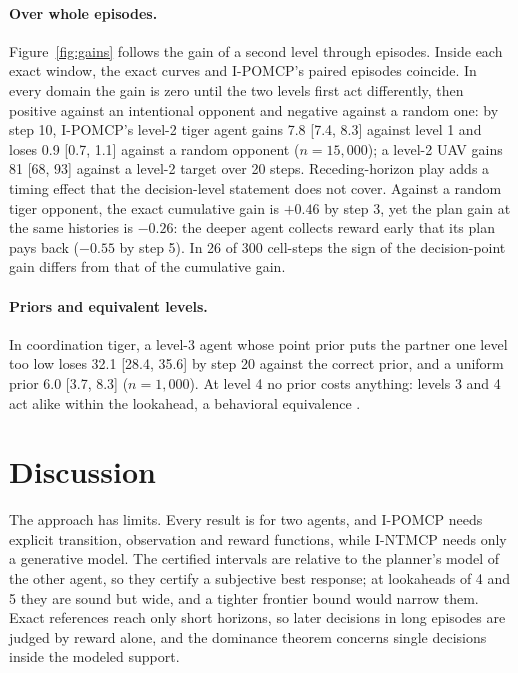 \documentclass{article}
\begin{document}
\paragraph{Over whole episodes.} Figure~\ref{fig:gains} follows the gain of a second level through episodes. Inside each exact window, the exact curves and I-POMCP's paired episodes coincide. In every domain the gain is zero until the two levels first act differently, then positive against an intentional opponent and negative against a random one: by step 10, I-POMCP's level-2 tiger agent gains 7.8 [7.4, 8.3] against level 1 and loses 0.9 [0.7, 1.1] against a random opponent ($n = 15{,}000$); a level-2 UAV gains 81 [68, 93] against a level-2 target over 20 steps. Receding-horizon play adds a timing effect that the decision-level statement does not cover. Against a random tiger opponent, the exact cumulative gain is $+0.46$ by step 3, yet the plan gain at the same histories is $-0.26$: the deeper agent collects reward early that its plan pays back ($-0.55$ by step 5). In 26 of 300 cell-steps the sign of the decision-point gain differs from that of the cumulative gain.

\paragraph{Priors and equivalent levels.} In coordination tiger, a level-3 agent whose point prior puts the partner one level too low loses 32.1 [28.4, 35.6] by step 20 against the correct prior, and a uniform prior 6.0 [3.7, 8.3] ($n = 1{,}000$). At level 4 no prior costs anything: levels 3 and 4 act alike within the lookahead, a behavioral equivalence \cite{rathnasabapathy2006exact}.

\section{Discussion}
\label{sec:discussion}

The approach has limits. Every result is for two agents, and I-POMCP needs explicit transition, observation and reward functions, while I-NTMCP needs only a generative model. The certified intervals are relative to the planner's model of the other agent, so they certify a subjective best response; at lookaheads of 4 and 5 they are sound but wide, and a tighter frontier bound would narrow them. Exact references reach only short horizons, so later decisions in long episodes are judged by reward alone, and the dominance theorem concerns single decisions inside the modeled support.
\end{document}
